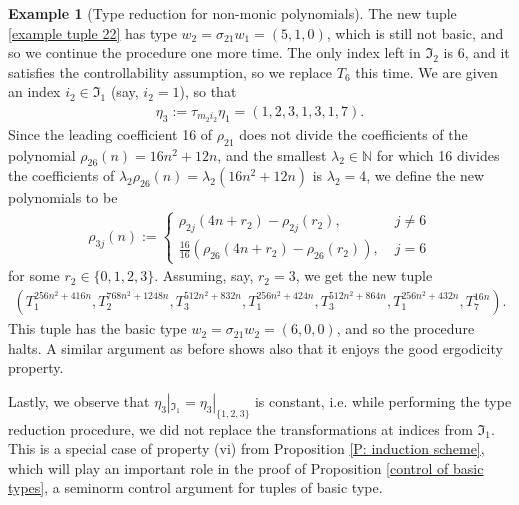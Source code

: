 \documentclass[11pt]{amsart}
\theoremstyle{definition}
\newtheorem{example}{Example}
\newcommand{\N}{{\mathbb N}}
\newcommand{\FI}{{\mathfrak I}}
\newcommand{\FL}{{\mathfrak L}}
\begin{document}
\begin{example}[Type reduction for non-monic polynomials]
The new tuple \eqref{example tuple 22} has type $w_2 = \sigma_{21}w_1 = (5,1, 0)$, which is still not basic, and so we continue the procedure one more time. The only index left in $\FI_2$ is $6$, and it satisfies the controllability assumption, so we replace $T_6$ this time. We are given an index $i_2\in\FI_1$ (say, $i_2 = 1$), so that
\begin{align*}
    \eta_3 := \tau_{m_2 i_2}\eta_1 = (1, 2, 3, 1, 3, 1, 7).
\end{align*}
Since the leading coefficient 16 of $\rho_{21}$ does not divide the coefficients of the polynomial $\rho_{26}(n) = 16n^2 + 12 n$, and the smallest $\lambda_2\in\N$ for which 16 divides the coefficients of $\lambda_2 \rho_{26}(n) = \lambda_2(16n^2+12n)$ is $\lambda_2 = 4$, we define the new polynomials to be
\begin{align*}
    \rho_{3j}(n) := \begin{cases} \rho_{2j}(4 n + r_2) - \rho_{2j}(r_2),\; &j \neq 6\\
    \frac{16}{16}(\rho_{26}(4 n + r_2) - \rho_{26}(r_2)),\; &j =6
    \end{cases}
\end{align*}
for some $r_2 \in\{0, 1, 2, 3\}$.
Assuming, say, $r_2 = 3$, we get the new tuple
\begin{align*}%
    (T_1^{256n^2 + 416n}, T_2^{768n^2+1248n}, T_3^{512n^2+832n}, T_1^{256n^2+424n}, T_3^{512n^2+864n}, T_1^{256n^2+432n}, T_7^{16n}).
\end{align*}
This tuple has the basic type $w_2 = \sigma_{21}w_2 = (6,0,0)$, and so the procedure halts. A similar argument as before shows also that it enjoys the good ergodicity property.

Lastly, we observe that $\eta_3|_{\FI_1} = \eta_3|_{\{1, 2, 3\}}$ is constant, i.e. while performing the type reduction procedure, we did not replace the transformations at indices from $\FI_1$. This is a special case of property (vi) from Proposition \ref{P: induction scheme}, which will play an important role in the proof of Proposition \ref{control of basic types}, a seminorm control argument for tuples of basic type.

\end{example}
\end{document}
